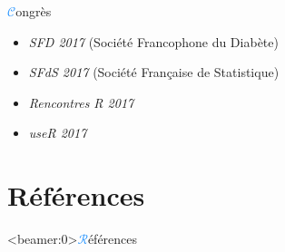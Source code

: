 \begin{frame}{{\huge\textcolor{dodgerblue}{$\mathcal{C}$}}ongrès}
\begin{itemize}
    \item \textcolor{springgreen3}{\textit{SFD 2017}} (Société Francophone du Diabète)
    \item \textcolor{springgreen3}{\textit{SFdS 2017}} (Société Française de Statistique)
    \item \textcolor{springgreen3}{\textit{Rencontres R 2017}}
    \item \textcolor{springgreen3}{\textit{useR 2017}}
\end{itemize}
\end{frame}


\section{Références}
\begin{frame}<beamer:0>{{\huge\textcolor{dodgerblue}{$\mathcal{R}$}}éférences}
    
    
\end{frame}


